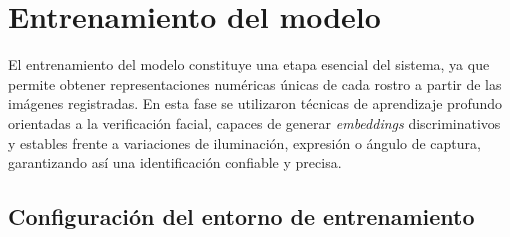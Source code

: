 \section{Entrenamiento del modelo}

El entrenamiento del modelo constituye una etapa esencial del sistema, ya que permite obtener representaciones numéricas únicas de cada rostro a partir de las imágenes registradas. En esta fase se utilizaron técnicas de aprendizaje profundo orientadas a la verificación facial, capaces de generar \textit{embeddings} discriminativos y estables frente a variaciones de iluminación, expresión o ángulo de captura, garantizando así una identificación confiable y precisa.

\subsection*{Configuración del entorno de entrenamiento}

